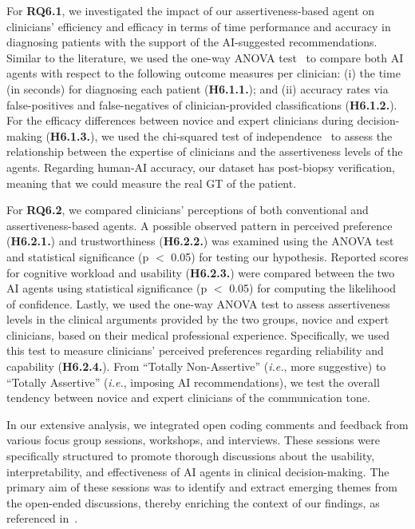 For {\bf RQ6.1}, we investigated the impact of our assertiveness-based agent on clinicians' efficiency and efficacy in terms of time performance and accuracy in diagnosing patients with the support of the AI-suggested recommendations.
Similar to the literature, we used the one-way \ac{ANOVA} test~\cite{SADEGHI2022105554, 10.1145/3491102.3517791} to compare both AI agents with respect to the following outcome measures per clinician:
(i) the time (in seconds) for diagnosing each patient ({\bf H6.1.1.}); and
(ii) accuracy rates via false-positives and false-negatives of clinician-provided classifications ({\bf H6.1.2.}).
For the efficacy differences between novice and expert clinicians during decision-making ({\bf H6.1.3.}), we used the chi-squared test of independence~\cite{10.1145/3411764.3445464} to assess the relationship between the expertise of clinicians and the assertiveness levels of the agents.
Regarding human-AI accuracy, our dataset has post-biopsy verification, meaning that we could measure the real \ac{GT} of the patient.

For {\bf RQ6.2}, we compared clinicians' perceptions of both conventional and assertiveness-based agents.
A possible observed pattern in perceived preference ({\bf H6.2.1.}) and trustworthiness ({\bf H6.2.2.}) was examined using the \ac{ANOVA} test and statistical significance (p $<$ 0.05) for testing our hypothesis.
Reported scores for cognitive workload and usability ({\bf H6.2.3.}) were compared between the two AI agents using statistical significance (p $<$ 0.05) for computing the likelihood of confidence.
\textcolor{revised}{Lastly, we used the one-way \ac{ANOVA} test to assess assertiveness levels in the clinical arguments provided by the two groups, novice and expert clinicians, based on their medical professional experience.}
Specifically, we used this test to measure clinicians' perceived preferences regarding reliability and capability ({\bf H6.2.4.}).
From ``Totally Non-Assertive'' ({\it i.e.}, more suggestive) to ``Totally Assertive'' ({\it i.e.}, imposing \ac{AI} recommendations), we test the overall tendency between novice and expert clinicians of the communication tone.

\textcolor{revised}{In our extensive analysis, we integrated open coding comments and feedback from various focus group sessions, workshops, and interviews.
These sessions were specifically structured to promote thorough discussions about the usability, interpretability, and effectiveness of \ac{AI} agents in clinical decision-making.
The primary aim of these sessions was to identify and extract emerging themes from the open-ended discussions, thereby enriching the context of our findings, as referenced in~\cite{SHIBUYA2022107131, BIEG2022107249}.}

